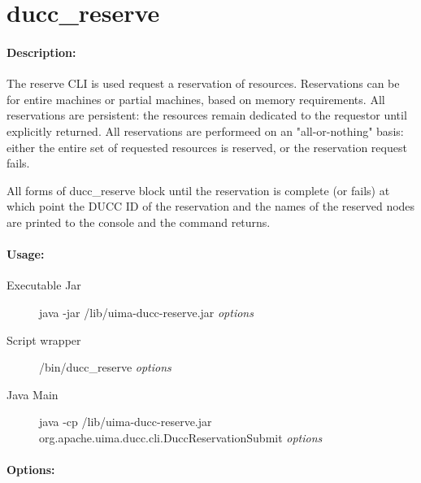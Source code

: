 \ifpdf
\else
{}
\fi
    \section{ducc\_reserve}

    \paragraph{Description:}
    The reserve CLI is used request a reservation of resources. Reservations can be for entire 
    machines or partial machines, based on memory requirements. All reservations are persistent: 
    the resources remain dedicated to the requestor until explicitly returned. All reservations are 
    performeed on an "all-or-nothing" basis: either the entire set of requested resources is reserved, 
    or the reservation request fails. 

    All forms of ducc\_reserve block until the reservation is complete (or fails) at which point the DUCC
    ID of the reservation and the names of the reserved nodes are printed to the console and the
    command returns.

    \paragraph{Usage:}
        \begin{description}
        \item[Executable Jar] java -jar \ducchome/lib/uima-ducc-reserve.jar {\em options}
        \item[Script wrapper] \ducchome/bin/ducc\_reserve {\em options}
        \item[Java Main]      java -cp \ducchome/lib/uima-ducc-reserve.jar org.apache.uima.ducc.cli.DuccReservationSubmit {\em options}
        \end{description}

    \paragraph{Options:}
    

